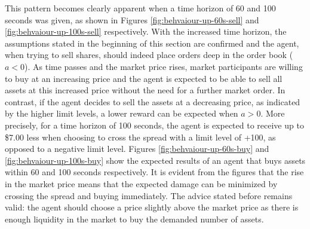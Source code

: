 This pattern becomes clearly apparent when a time horizon of 60 and 100 seconds was given, as shown in Figures \ref{fig:behvaiour-up-60s-sell} and \ref{fig:behvaiour-up-100s-sell} respectively.
With the increased time horizon, the assumptions stated in the beginning of this section are confirmed and the agent, when trying to sell shares, should indeed place orders deep in the order book ($a<0$).
As time passes and the market price rises, market participants are willing to buy at an increasing price and the agent is expected to be able to sell all assets at this increased price without the need for a further market order.
In contrast, if the agent decides to sell the assets at a decreasing price, as indicated by the higher limit levels, a lower reward can be expected when $a>0$.
More precisely, for a time horizon of 100 seconds, the agent is expected to receive up to \$7.00 less when choosing to cross the spread with a limit level of +100, as opposed to a negative limit level.
Figures \ref{fig:behvaiour-up-60s-buy} and \ref{fig:behvaiour-up-100s-buy} show the expected results of an agent that buys assets within 60 and 100 seconds respectively.
It is evident from the figures that the rise in the market price means that the expected damage can be minimized by crossing the spread and buying immediately.
The advice stated before remains valid: the agent should choose a price slightly above the market price as there is enough liquidity in the market to buy the demanded number of assets.

